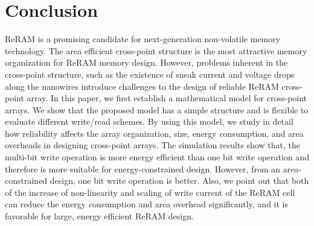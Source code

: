 
\section{Conclusion}\label{sec:conclusion}
\vspace{10pt}
ReRAM is a promising candidate for next-generation non-volatile memory
technology. The area efficient cross-point structure is the most
attractive memory organization for ReRAM memory design. However, problems
inherent in the cross-point structure, such as the existence of sneak
current and voltage drops along the nanowires introduce challenges to the
design of reliable ReRAM cross-point array. In this paper, we first
establish a mathematical model for cross-point arrays. We show that the
proposed model has a simple structure and is flexible to evaluate
different write/read schemes. By using this model, we study in detail how
reliability affects the array organization, size, energy consumption, and
area overheads in designing cross-point arrays. The simulation results
show that, the multi-bit write operation is more energy efficient than one
bit write operation and therefore is more suitable for energy-constrained
design. However, from an area-constrained design, one bit write operation
is better. Also, we point out that both of the increase of non-linearity
and scaling of write current of the ReRAM cell can reduce the energy
consumption and area overhead significantly, and it is favorable for
large, energy efficient ReRAM design.
